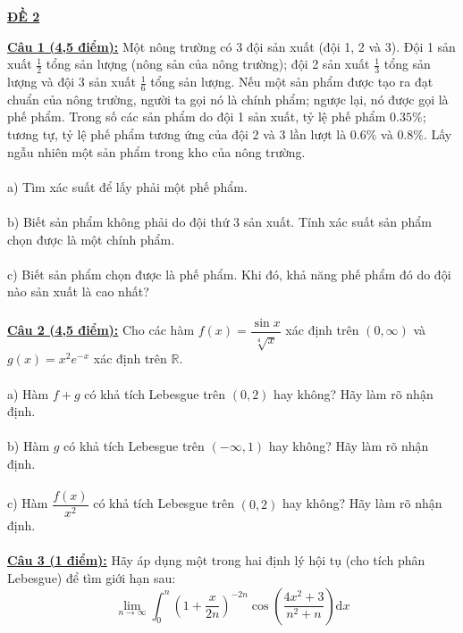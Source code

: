 \documentclass[10pt, a4paper]{article}
\begin{document}
\begin{center}
	\color{blue}\underline{\textbf{ĐỀ 2}}
\end{center}
\color{red}\underline{\textbf{Câu 1 (4,5 điểm):}} \color{black}Một nông trường có 3 đội sản xuất (đội 1, 2 và 3). Đội 1 sản xuất $\frac12$ tổng sản lượng (nông sản của nông trường); đội 2 sản xuất $\frac13$ tổng sản lượng và đội 3 sản xuất $\frac16$ tổng sản lượng. Nếu một sản phẩm được tạo ra đạt chuẩn của nông trường, người ta gọi nó là chính phẩm; ngược lại, nó được gọi là phế phẩm. Trong số các sản phẩm do đội 1 sản xuất, tỷ lệ phế phẩm $0.35\%$; tương tự, tỷ lệ phế phẩm tương ứng của đội 2 và 3 lần lượt là $0.6\%$ và $0.8\%$. Lấy ngẫu nhiên một sản phẩm trong kho của nông trường.\\\\
\color{red}a) \color{black}Tìm xác suất để lấy phải một phế phẩm.\\\\
\color{red}b) \color{black}Biết sản phẩm không phải do đội thứ 3 sản xuất. Tính xác suất sản phẩm chọn được là một chính phẩm.\\\\
\color{red}c) \color{black}Biết sản phẩm chọn được là phế phẩm. Khi đó, khả năng phế phẩm đó do đội nào sản xuất là cao nhất?\\\\
\color{red}\underline{\textbf{Câu 2 (4,5 điểm):}} \color{black}Cho các hàm $f(x)=\dfrac{\sin x}{\sqrt[4] x}$ xác định trên $(0,\infty)$ và $g(x)=x^2e^{-x}$ xác định trên $\mathbb R$.\\\\
\color{red}a) \color{black}Hàm $f+g$ có khả tích Lebesgue trên $(0,2)$ hay không? Hãy làm rõ nhận định.\\\\
\color{red}b) \color{black}Hàm $g$ có khả tích Lebesgue trên $(-\infty, 1)$ hay không? Hãy làm rõ nhận định.\\\\
\color{red}c) \color{black}Hàm $\dfrac{f(x)}{x^2}$ có khả tích Lebesgue trên $(0,2)$ hay không? Hãy làm rõ nhận định.\\\\
\color{red}\underline{\textbf{Câu 3 (1 điểm):}} \color{black}Hãy áp dụng một trong hai định lý hội tụ (cho tích phân Lebesgue) để tìm giới hạn sau: $$\displaystyle\lim_{n\rightarrow\infty}\displaystyle\int_0^n\left(1+\dfrac x{2n}\right)^{-2n}\cos\left(\dfrac{4x^2+3}{n^2+n}\right)\text{d}x$$
\newpage
\end{document}
